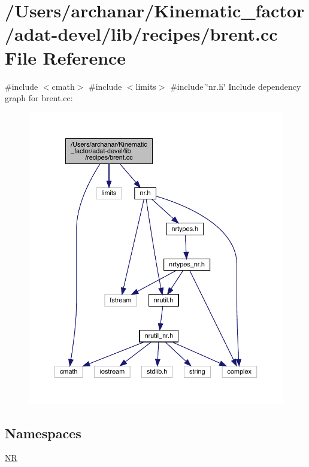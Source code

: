 \hypertarget{adat-devel_2lib_2recipes_2brent_8cc}{}\section{/\+Users/archanar/\+Kinematic\+\_\+factor/adat-\/devel/lib/recipes/brent.cc File Reference}
\label{adat-devel_2lib_2recipes_2brent_8cc}
{\ttfamily \#include $<$cmath$>$}\newline
{\ttfamily \#include $<$limits$>$}\newline
{\ttfamily \#include \char`\"{}nr.\+h\char`\"{}}\newline
Include dependency graph for brent.\+cc\+:
\nopagebreak
\begin{figure}[H]
\begin{center}
\leavevmode
\includegraphics[width=350pt]{dc/d40/adat-devel_2lib_2recipes_2brent_8cc__incl}
\end{center}
\end{figure}
\subsection*{Namespaces}
\begin{DoxyCompactItemize}
\item 
 \mbox{\hyperlink{namespaceNR}{NR}}
\end{DoxyCompactItemize}
